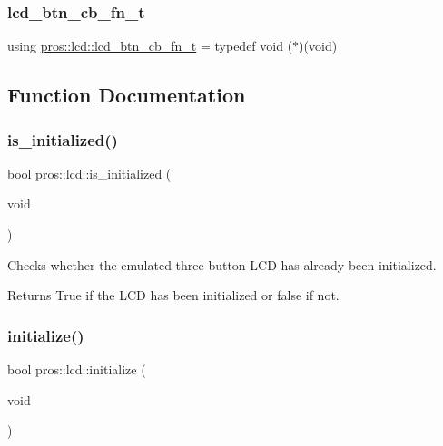 \subsubsection{\texorpdfstring{lcd\+\_\+btn\+\_\+cb\+\_\+fn\+\_\+t}{lcd\_btn\_cb\_fn\_t}}
{\footnotesize\ttfamily using \hyperlink{namespacepros_1_1lcd_ab5c0cdcf37795ff2a9dcaf546b087dd4}{pros\+::lcd\+::lcd\+\_\+btn\+\_\+cb\+\_\+fn\+\_\+t} = typedef void ($\ast$)(void)}



\subsection{Function Documentation}
\mbox{\label{namespacepros_1_1lcd_a867eb9cd989e1c6c31982fe2b5c58dd9}} 
\subsubsection{\texorpdfstring{is\+\_\+initialized()}{is\_initialized()}}
{\footnotesize\ttfamily bool pros\+::lcd\+::is\+\_\+initialized (\begin{DoxyParamCaption}\item[{void}]{ }\end{DoxyParamCaption})}



Checks whether the emulated three-\/button L\+CD has already been initialized. 

\begin{DoxyReturn}{Returns}
True if the L\+CD has been initialized or false if not. 
\end{DoxyReturn}
\mbox{\label{namespacepros_1_1lcd_afb69bfa2fc5da3018b6886f612ed190e}} 
\subsubsection{\texorpdfstring{initialize()}{initialize()}}
{\footnotesize\ttfamily bool pros\+::lcd\+::initialize (\begin{DoxyParamCaption}\item[{void}]{ }\end{DoxyParamCaption})}



